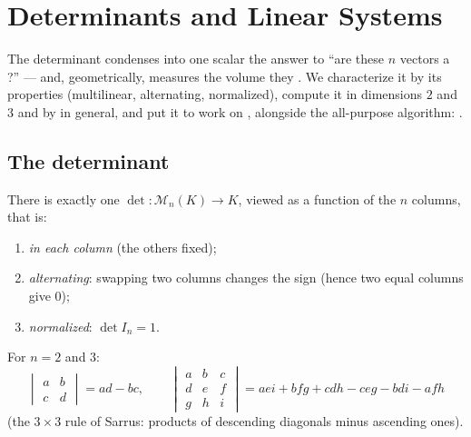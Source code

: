 \chapter{Determinants and Linear Systems}\label{ch:b1:det}

The determinant condenses into one scalar the answer to ``are these
$n$ vectors a ?'' --- and, geometrically, measures the volume
they . We characterize it by its properties (multilinear,
alternating, normalized), compute it in dimensions $2$ and $3$ and by
 in general, and put it to work on ,
alongside the all-purpose algorithm: .

\section{The determinant}

\begin{theorem}[Characterization]\label{thm:b1:det:def}
There is exactly one  $\det \colon \mathcal{M}_n(K) \to K$,
viewed as a function of the $n$ columns, that is:
\begin{enumerate}
  \item \emph{ in each column} (the others fixed);
  \item \emph{alternating}: swapping two columns changes the sign
        (hence two equal columns give $0$);
  \item \emph{normalized}: $\det I_n = 1$.
\end{enumerate}
For $n = 2$ and $3$:
\[
\begin{vmatrix} a & b\\ c & d\end{vmatrix} = ad - bc,
\qquad
\begin{vmatrix} a & b & c\\ d & e & f\\ g & h & i\end{vmatrix}
= aei + bfg + cdh - ceg - bdi - afh
\]
(the $3 \times 3$ rule of Sarrus: products of descending diagonals
minus ascending ones).
\end{theorem}
\admitted


